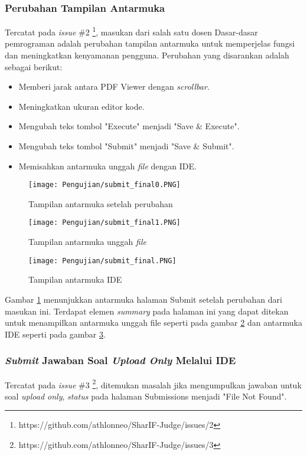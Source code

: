 \subsubsection{Perubahan Tampilan Antarmuka}
Tercatat pada \textit{issue} \#2 \footnote{https://github.com/athlonneo/SharIF-Judge/issues/2}, masukan dari salah satu dosen Dasar-dasar pemrograman adalah perubahan tampilan antarmuka untuk memperjelas fungsi dan meningkatkan kenyamanan pengguna. Perubahan yang disarankan adalah sebagai berikut:
\begin{itemize}
    \item Memberi jarak antara PDF Viewer dengan \textit{scrollbar}.
    \item Meningkatkan ukuran editor kode.
    \item Mengubah teks tombol "Execute" menjadi "Save \& Execute".
    \item Mengubah teks tombol "Submit" menjadi "Save \& Submit".
    \item Memisahkan antarmuka unggah \textit{file} dengan IDE.
\end{itemize}

\begin{figure}[H]
	\centering  
	\texttt{[image: Pengujian/submit\_final0.PNG]}  
	\caption{Tampilan antarmuka setelah perubahan}
	\label{fig:5:submit0} 
\end{figure} 

\begin{figure}[H]
	\centering  
	\texttt{[image: Pengujian/submit\_final1.PNG]}  
	\caption{Tampilan antarmuka unggah \textit{file}}
	\label{fig:5:submit1} 
\end{figure} 

\begin{figure}[H]
	\centering  
	\texttt{[image: Pengujian/submit\_final.PNG]}  
	\caption{Tampilan antarmuka IDE}
	\label{fig:5:submit2} 
\end{figure} 

Gambar \ref{fig:5:submit0} menunjukkan antarmuka halaman Submit setelah perubahan dari masukan ini. Terdapat elemen \textit{summary} pada halaman ini yang dapat ditekan untuk menampilkan antarmuka unggah file seperti pada gambar \ref{fig:5:submit1} dan antarmuka IDE seperti pada gambar \ref{fig:5:submit2}.

\subsubsection{\textit{Submit} Jawaban Soal \textit{Upload Only} Melalui IDE}
Tercatat pada \textit{issue} \#3 \footnote{https://github.com/athlonneo/SharIF-Judge/issues/3}, ditemukan masalah jika mengumpulkan jawaban untuk soal \textit{upload only}, \textit{status} pada halaman Submissions menjadi "File Not Found".

